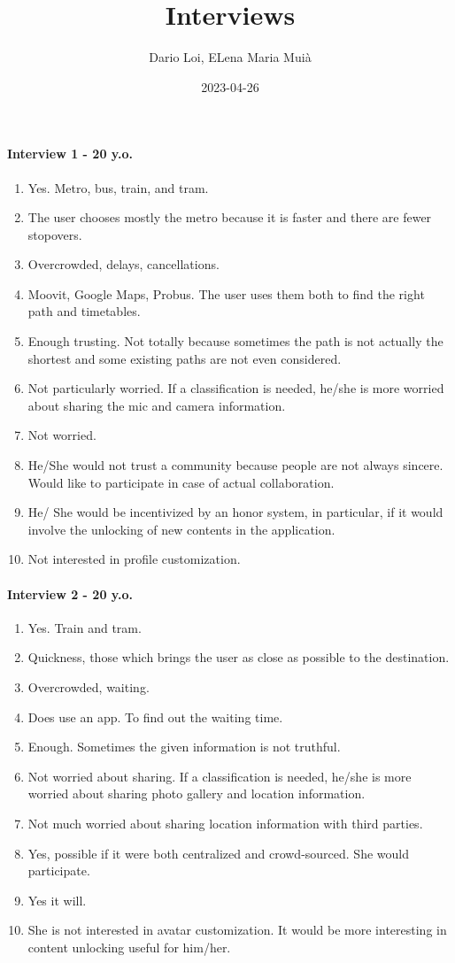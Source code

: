 \documentclass[a4paper, 10pt]{article}
\title{Interviews}
\author{Dario Loi, ELena Maria Muià}
\date{2023-04-26}
\begin{document}
\maketitle
\paragraph*{Interview 1 - 20 y.o.}
\begin{enumerate}
    \item Yes. Metro, bus, train, and tram.
    \item The user chooses mostly the metro because it is faster and there are fewer stopovers.
    \item Overcrowded, delays, cancellations.
    \item Moovit, Google Maps, Probus. The user uses them both to find the right path and timetables.
    \item Enough trusting. Not totally because sometimes the path is not actually the shortest and some existing paths are not even considered.
    \item Not particularly worried. If a classification is needed, he/she is more worried about sharing the mic and camera information.
    \item Not worried.
    \item He/She would not trust a community because people are not always sincere. Would like to participate in case of actual collaboration.
    \item He/ She would be incentivized by an honor system, in particular, if it would involve the unlocking of new contents in the application.
    \item Not interested in profile customization.

\end{enumerate}

\paragraph*{Interview 2 - 20 y.o.}
\begin{enumerate}
    \item Yes. Train and tram.
    \item Quickness, those which brings the user as close as possible to the destination.
    \item Overcrowded, waiting.
    \item Does use an app. To find out the waiting time.
    \item Enough. Sometimes the given information is not truthful.
    \item Not worried about sharing. If a classification is needed, he/she is more worried about sharing photo gallery and location information.
    \item Not much worried about sharing location information with third parties.
    \item Yes, possible if it were both centralized and crowd-sourced. She would participate.
    \item Yes it will.
    \item She is not interested in avatar customization. It would be more interesting in content unlocking useful for him/her.
\end{enumerate}
\end{document}
